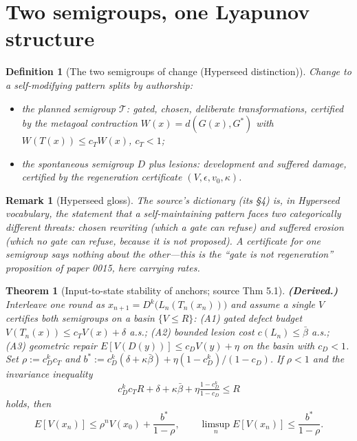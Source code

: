 \documentclass[11pt]{article}
\newtheorem{definition}{Definition}
\newtheorem{theorem}{Theorem}
\newtheorem{remark}{Remark}
\newcommand{\D}{D}
\newcommand{\T}{\mathcal{T}}
\begin{document}
\section{Two semigroups, one Lyapunov structure}

\begin{definition}[The two semigroups of change (Hyperseed distinction)]\label{def:semigroups}
Change to a self-modifying pattern splits by \emph{authorship}:
\begin{itemize}
\item the \emph{planned semigroup} $\T$: gated, chosen, deliberate transformations,
certified by the metagoal contraction $W(x) = d(G(x), G^{*})$ with
$W(T(x)) \le c_T W(x)$, $c_T < 1$;
\item the \emph{spontaneous semigroup} $\D$ plus lesions: development and suffered
damage, certified by the regeneration certificate $(V, \epsilon, v_0, \kappa)$.
\end{itemize}
\end{definition}

\begin{remark}[Hyperseed gloss]
The source's dictionary (its \S4) is, in Hyperseed vocabulary, the statement that a
self-maintaining pattern faces two categorically different threats: \emph{chosen}
rewriting (which a gate can refuse) and \emph{suffered} erosion (which no gate can
refuse, because it is not proposed). A certificate for one semigroup says nothing about
the other---this is the ``gate is not regeneration'' proposition of paper 0015, here
carrying rates.
\end{remark}

\begin{theorem}[Input-to-state stability of anchors; source Thm 5.1]\label{thm:iss}
\textbf{(Derived.)} Interleave one round as
$x_{n+1} = \D^k\bigl( L_n( T_n(x_n))\bigr)$ and assume a single $V$ certifies both
semigroups on a basin $\{V \le R\}$: (A1) gated defect budget $V(T_n(x)) \le c_T V(x) + \delta$
a.s.; (A2) bounded lesion cost $c(L_n) \le \bar\beta$ a.s.; (A3) geometric repair
$E[V(\D(y))] \le c_{\D} V(y) + \eta$ on the basin with $c_{\D} < 1$. Set
$\rho := c_{\D}^k c_T$ and $b^{*} := c_{\D}^k(\delta + \kappa\bar\beta) + \eta(1-c_{\D}^k)/(1-c_{\D})$.
If $\rho < 1$ and the invariance inequality
\[
c_{\D}^k c_T R + \delta + \kappa\bar\beta + \eta\tfrac{1-c_{\D}^k}{1-c_{\D}} \le R \tag{Inv}
\]
holds, then
\[
E[V(x_n)] \le \rho^n V(x_0) + \frac{b^{*}}{1-\rho},
\qquad
\limsup_n E[V(x_n)] \le \frac{b^{*}}{1-\rho}.
\]
\end{theorem}
\end{document}
